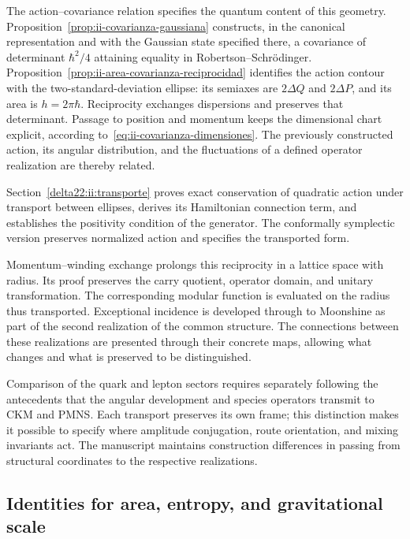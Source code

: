 The action--covariance relation specifies the quantum content of this
geometry. Proposition~\ref{prop:ii-covarianza-gaussiana} constructs,
in the canonical representation and with the Gaussian state specified there,
a covariance of determinant \(\hbar^2/4\) attaining equality in
Robertson--Schrödinger. Proposition~\ref{prop:ii-area-covarianza-reciprocidad}
identifies the action contour with the two-standard-deviation
ellipse: its semiaxes are \(2\Delta Q\) and \(2\Delta P\), and its area
is \(h=2\pi\hbar\). Reciprocity exchanges dispersions and
preserves that determinant. Passage to position and momentum keeps the
dimensional chart explicit, according to~\eqref{eq:ii-covarianza-dimensiones}.
The previously constructed action, its angular distribution,
and the fluctuations of a defined operator realization are thereby related.

Section~\ref{delta22:ii:transporte} proves exact conservation of
quadratic action under transport between ellipses, derives its
Hamiltonian connection term, and establishes the positivity condition
of the generator. The conformally symplectic version preserves
normalized action and specifies the transported form.


Momentum--winding exchange prolongs this reciprocity in
a lattice space with radius. Its proof preserves the carry
quotient, operator domain, and unitary transformation.
The corresponding modular function is evaluated on the radius thus
transported. Exceptional incidence is developed through to Moonshine
as part of the second realization of the common structure. The
connections between these realizations are presented through their concrete
maps, allowing what changes and what is preserved to be distinguished.

Comparison of the quark and lepton sectors requires separately following
the antecedents that the angular development and species operators
transmit to CKM and PMNS. Each transport preserves its own frame; this
distinction makes it possible to specify where amplitude conjugation,
route orientation, and mixing invariants act. The manuscript
maintains construction differences in passing from structural
coordinates to the respective realizations.

\subsection{Identities for area, entropy, and gravitational scale}

